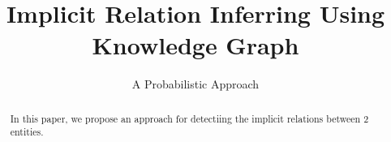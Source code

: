 \documentclass{sig-alternate}
\begin{document}
\title{Implicit Relation Inferring Using Knowledge Graph}
\subtitle{A Probabilistic Approach}




\maketitle
\begin{abstract}
In this paper, we propose an approach for detectiing the implicit relations between 2 entities.
\end{abstract}














\end{document}
